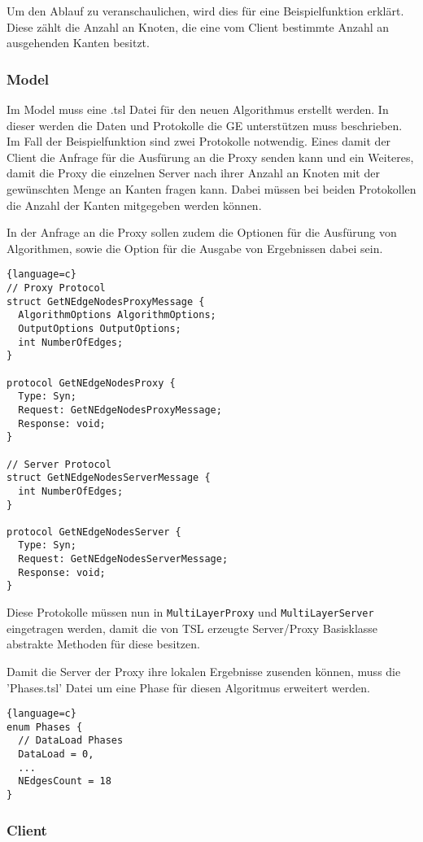 Um den Ablauf zu veranschaulichen, wird dies für eine Beispielfunktion erklärt. Diese zählt die Anzahl an Knoten, die eine vom Client bestimmte Anzahl an ausgehenden Kanten besitzt.

\subsubsection{Model}

Im Model muss eine .tsl Datei für den neuen Algorithmus erstellt werden. In dieser werden die Daten und Protokolle die GE unterstützen muss beschrieben. Im Fall der Beispielfunktion sind zwei Protokolle notwendig.
Eines damit der Client die Anfrage für die Ausfürung an die Proxy senden kann und ein Weiteres, damit die Proxy die einzelnen Server nach ihrer Anzahl an Knoten mit der gewünschten Menge an Kanten fragen kann.
Dabei müssen bei beiden Protokollen die Anzahl der Kanten mitgegeben werden können.

In der Anfrage an die Proxy sollen zudem die Optionen für die Ausfürung von Algorithmen, sowie die Option für die Ausgabe von Ergebnissen dabei sein.

\begin{lstlisting}{language=c}
// Proxy Protocol
struct GetNEdgeNodesProxyMessage {
  AlgorithmOptions AlgorithmOptions;
  OutputOptions OutputOptions;
  int NumberOfEdges;  
}

protocol GetNEdgeNodesProxy {
  Type: Syn;
  Request: GetNEdgeNodesProxyMessage;
  Response: void;
}

// Server Protocol
struct GetNEdgeNodesServerMessage {
  int NumberOfEdges;
}

protocol GetNEdgeNodesServer {
  Type: Syn;
  Request: GetNEdgeNodesServerMessage;
  Response: void;
}
\end{lstlisting}

Diese Protokolle müssen nun in \verb|MultiLayerProxy| und \verb|MultiLayerServer| eingetragen werden, damit die von TSL erzeugte Server/Proxy Basisklasse abstrakte Methoden für diese besitzen.

Damit die Server der Proxy ihre lokalen Ergebnisse zusenden können, muss die 'Phases.tsl' Datei um eine Phase für diesen Algoritmus erweitert werden.

\begin{lstlisting}{language=c}
enum Phases {
  // DataLoad Phases
  DataLoad = 0,
  ...
  NEdgesCount = 18
}
\end{lstlisting}


\subsubsection{Client}


